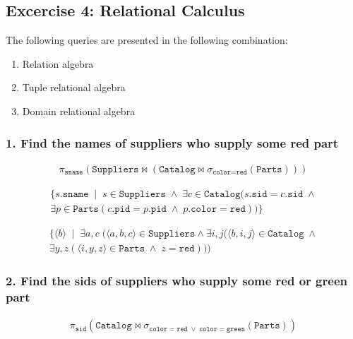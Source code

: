\subsection{Excercise 4: Relational Calculus}

The following queries are presented in the following combination:

\begin{enumerate}[noitemsep]
  \item Relation algebra
  \item Tuple relational algebra
  \item Domain relational algebra
\end{enumerate}

\subsubsection{1. Find the names of suppliers who supply some red part}

\begin{align*}
  \pi_{\texttt{sname}}(\texttt{Suppliers} \bowtie (\texttt{Catalog} \bowtie \sigma_{\texttt{color} = \texttt{red}}(\texttt{Parts})))
\end{align*}
 
\begin{align*}
  \{s.\texttt{sname} \; \mid \; s \in \texttt{Suppliers} \; \wedge \; \exists c \in \texttt{Catalog}(s.\mathtt{sid} = c.\mathtt{sid} \; \wedge \\
\exists p \in \texttt{Parts}(c.\mathtt{pid} = p.\mathtt{pid} \; \wedge \; p.\mathtt{color} = \mathtt{red}))\} 
\end{align*}

\begin{align*}
  \{\langle b \rangle  \; \mid \; \exists a, c \; (\langle a, b, c \rangle \in \mathtt{Suppliers} \wedge 
    \exists i,j(\langle b,i,j \rangle  \in \mathtt{Catalog} \; \wedge \\
 \exists y, z(\langle i, y, z \rangle  \in \mathtt{Parts} \; \wedge \; z = \mathtt{red})
 ))
\end{align*}

\subsubsection{2. Find the sids of suppliers who supply some red or green part}

\begin{align*}
   \pi_{\mathtt{sid}}(\mathtt{Catalog} \bowtie \sigma_{\mathtt{color} = \mathtt{red} \; \vee \; \mathtt{color} = \mathtt{green} }(\mathtt{Parts}))
\end{align*}

